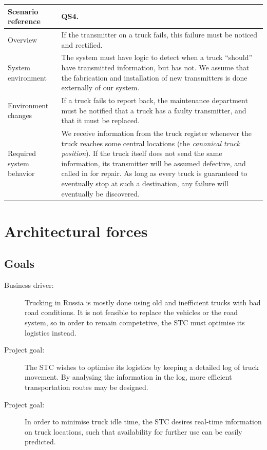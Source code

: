 \documentclass[a4paper,11pt]{report}
\begin{document}
\begin{center}
  \begin{tabular}[h!]{| >{\columncolor{gray}}p{} | p{} |}
    \hline
    Scenario reference & QS4. \\
    \hline
    Overview & If the transmitter on a truck fails, this failure must be noticed and rectified. \\
    \hline
    System environment & The system must have logic to detect when a truck ``should'' have transmitted information, but has not.  We assume that the fabrication and installation of new transmitters is done externally of our system. \\
    \hline
    Environment changes & If a truck fails to report back, the maintenance department must be notified that a truck has a faulty transmitter, and that it must be replaced. \\
    \hline
    Required system behavior & We receive information from the truck register whenever the truck reaches some central locations (the \textit{canonical truck position}).  If the truck itself does not send the same information, its transmitter will be assumed defective, and called in for repair.  As long as every truck is guaranteed to eventually stop at such a destination, any failure will eventually be discovered. \\
    \hline
  \end{tabular}
\end{center}

\chapter{Architectural forces}
\label{cha:architectural-forces}
\thispagestyle{fancy}

\section{Goals}
\label{sec:goals}

\begin{description}
\item[Business driver:] Trucking in Russia is mostly done using old and inefficient
  trucks with bad road conditions.  It is not feasible to replace the
  vehicles or the road system, so in order to remain competetive, the
  STC must optimise its logistics instead.
\item[Project goal:] The STC wishes to optimise its logistics by
  keeping a detailed log of truck movement.  By analysing the
  information in the log, more efficient transportation routes may be
  designed.
\item[Project goal:] In order to minimise truck idle time, the STC
  desires real-time information on truck locations, such that
  availability for further use can be easily predicted.
\end{description}
\end{document}
